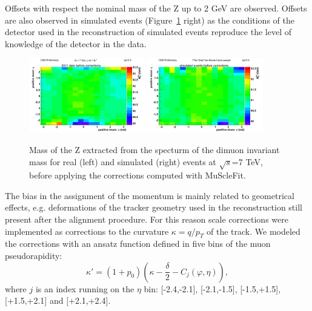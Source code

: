 Offsets with respect the nominal mass of the Z up to 2 GeV are observed. 
Offsets are also observed in simulated events
(Figure~\ref{fig:etaphi_44X_before} right) as the conditions of 
the detector used in the reconstruction of simulated events reproduce the
level of knowledge of the detector in the data.
\begin{figure}[hbtp]  
\begin{center}
\includegraphics[width=0.45\textwidth]{figures/TkAl_Style/Data2011_44X/MassVsEtaPhiPlus_file0}
\includegraphics[width=0.45\textwidth]{figures/TkAl_Style/MC2011_44X/MassVsEtaPhiPlus_file0}
 \hspace{1cm} 
   \caption{Mass of the Z extracted from the specturm of the dimuon
     invariant mass for real (left) and simulated (right) events at $\sqrt{s}$=7 TeV, before
     applying the corrections computed with MuScleFit.
   \label{fig:etaphi_44X_before}}
 \end{center}
\end{figure} 
The bias in the assignment of the momentum is mainly
related to geometrical effects, e.g. deformations of the tracker
geometry used in the reconstruction still present after the
alignment procedure.
For this reason scale corrections were implemented as corrections to the curvature
$\kappa=q/p_T$ of the track. We modeled the corrections with an ansatz function defined in five
bins of the muon pseudorapidity: 
\begin{equation}
\kappa' = (1+p_0) \left( \kappa -\frac{\delta}{2} - C_j(\varphi,\eta)  \right),
\label{eq:scale_function}
\end{equation}
where $j$ is an index running on the $\eta$ bin: [-2.4,-2.1],
[-2.1,-1.5], [-1.5,+1.5], [+1.5,+2.1] and [+2.1,+2.4].\\
